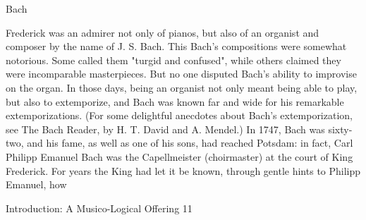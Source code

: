                                           Bach

Frederick was an admirer not only of pianos, but also of an organist and composer by the
name of J. S. Bach. This Bach's compositions were somewhat notorious. Some called
them "turgid and confused", while others claimed they were incomparable masterpieces.
But no one disputed Bach's ability to improvise on the organ. In those days, being an
organist not only meant being able to play, but also to extemporize, and Bach was known
far and wide for his remarkable extemporizations. (For some delightful anecdotes about
Bach's extemporization, see The Bach Reader, by H. T. David and A. Mendel.)
   In 1747, Bach was sixty-two, and his fame, as well as one of his sons, had reached
Potsdam: in fact, Carl Philipp Emanuel Bach was the Capellmeister (choirmaster) at the
court of King Frederick. For years the King had let it be known, through gentle hints to
Philipp Emanuel, how




Introduction: A Musico-Logical Offering                                                11

